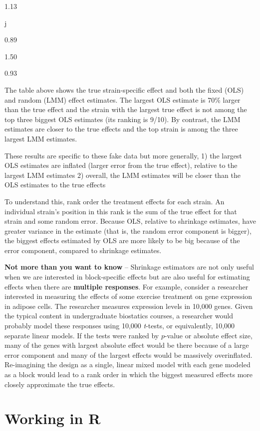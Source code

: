 \documentclass[]{book}
\begin{document}
1.13

j

0.89

1.50

0.93

The table above shows the true strain-specific effect and both the fixed
(OLS) and random (LMM) effect estimates. The largest OLS estimate is
70\% larger than the true effect and the strain with the largest true
effect is not among the top three biggest OLS estimates (its ranking is
9/10). By contrast, the LMM estimates are closer to the true effects and
the top strain is among the three largest LMM estimates.

These results are specific to these fake data but more generally, 1) the
largest OLS estimates are inflated (larger error from the true effect),
relative to the largest LMM estimates 2) overall, the LMM estimates will
be closer than the OLS estimates to the true effects

To understand this, rank order the treatment effects for each strain. An
individual strain's position in this rank is the sum of the true effect
for that strain and some random error. Because OLS, relative to
shrinkage estimates, have greater variance in the estimate (that is, the
random error component is bigger), the biggest effects estimated by OLS
are more likely to be big because of the error component, compared to
shrinkage estimates.

\textbf{Not more than you want to know} -- Shrinkage estimators are not
only useful when we are interested in block-specific effects but are
also useful for estimating effects when there are \textbf{multiple
responses}. For example, consider a researcher interested in measuring
the effects of some exercise treatment on gene expression in adipose
cells. The researcher measures expression levels in 10,000 genes. Given
the typical content in undergraduate biostatics courses, a researcher
would probably model these responses using 10,000 \emph{t}-tests, or
equivalently, 10,000 separate linear models. If the tests were ranked by
\(p\)-value or absolute effect size, many of the genes with largest
absolute effect would be there because of a large error component and
many of the largest effects would be massively overinflated.
Re-imagining the design as a single, linear mixed model with each gene
modeled as a block would lead to a rank order in which the biggest
measured effects more closely approximate the true effects.

\section{Working in R}\label{working-in-r-7}
\end{document}
